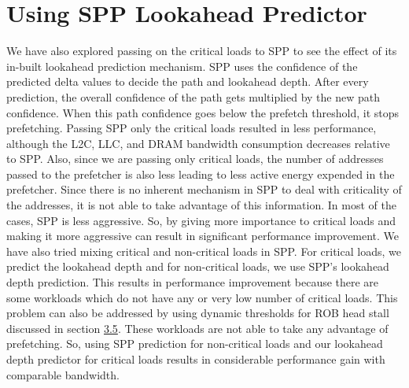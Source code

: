 \section{Using SPP Lookahead Predictor}

We have also explored passing on the critical loads to SPP to see the effect of its in-built lookahead prediction mechanism. SPP uses the confidence of the predicted delta values to decide the path and lookahead depth. After
every prediction, the overall confidence of the path gets multiplied by the new path confidence.
When this path confidence goes below the prefetch threshold, it stops prefetching.
Passing SPP only the critical loads resulted in less performance, although the L2C, LLC, and DRAM bandwidth consumption decreases relative to SPP. Also, since we are passing only critical loads, the
number of addresses passed to the prefetcher is also less leading to less active energy expended in the prefetcher.
Since there is no inherent mechanism in SPP to deal with criticality of the addresses, it is not
able to take advantage of this information. In most of the cases, SPP is less aggressive. So, by giving more importance to critical loads and making it more aggressive
can result in significant performance improvement.
We have also tried mixing critical and non-critical loads in SPP. For critical loads, we predict the
lookahead depth and for non-critical loads, we use SPP's lookahead depth prediction. This results in performance improvement because there are some workloads which do not have any or very low number of critical loads.
This problem can also be addressed by using dynamic thresholds for ROB head stall discussed in section \hyperref[Critical IP]{3.5}.
These workloads are not able to take any advantage of prefetching. So, using SPP prediction
for non-critical loads and our lookahead depth predictor for critical loads results in
considerable performance gain with comparable bandwidth.


